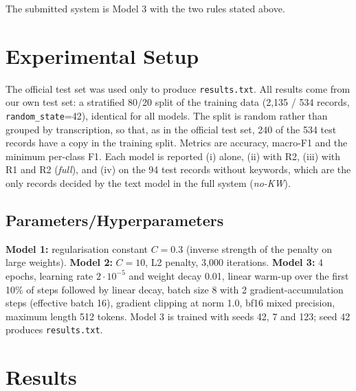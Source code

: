 \documentclass[twocolumn,10pt]{article}
\begin{document}
\noindent The submitted system is Model 3 with the two rules stated above.

\section{Experimental Setup}

\noindent The official test set was used only to produce \texttt{results.txt}. All results come from our own test set: a stratified 80/20 split of the training data (2,135 / 534 records, \texttt{random\_state}=42), identical for all models. The split is random rather than grouped by transcription, so that, as in the official test set, 240 of the 534 test records have a copy in the training split. Metrics are accuracy, macro-F1 and the minimum per-class F1. Each model is reported (i) alone, (ii) with R2, (iii) with R1 and R2 (\emph{full}), and (iv) on the 94 test records without keywords, which are the only records decided by the text model in the full system (\emph{no-KW}).

\subsection{Parameters/Hyperparameters}

\noindent\textbf{Model 1:} regularisation constant $C=0.3$ (inverse strength of the penalty on large weights). \textbf{Model 2:} $C=10$, L2 penalty, 3,000 iterations. \textbf{Model 3:} 4 epochs, learning rate $2\cdot10^{-5}$ and weight decay 0.01, linear warm-up over the first 10\% of steps followed by linear decay, batch size 8 with 2 gradient-accumulation steps (effective batch 16), gradient clipping at norm 1.0, bf16 mixed precision, maximum length 512 tokens. Model 3 is trained with seeds 42, 7 and 123; seed 42 produces \texttt{results.txt}.
\section{Results}
\end{document}
